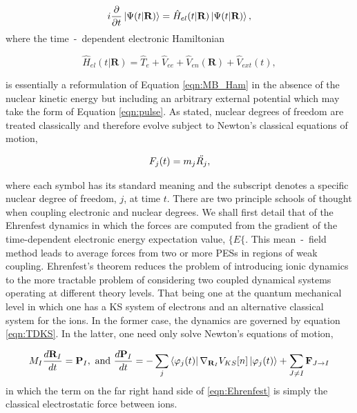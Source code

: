 \begin{equation}
    i \frac{\partial}{\partial t} \ket{\Psi(t|\textbf{R})} = \hat{H}_{el}(t|\textbf{R})\ket{\Psi(t|\textbf{R})},
    \label{eqn:nanm_TDSE}
\end{equation}
where the time~-~dependent electronic Hamiltonian 

\begin{equation}
    \hat{H}_{el}(t|\textbf{R}) = \hat{T}_{e} + \hat{V}_{ee} + \hat{V}_{en}(\textbf{R}) + \hat{V}_{ext}(t),
    \label{eqn:nanm_ham}
\end{equation}

is essentially a reformulation of Equation \ref{eqn:MB_Ham} in the absence of the nuclear kinetic energy but including an arbitrary external potential which may take the form of Equation \ref{eqn:pulse}. As stated, nuclear degrees of freedom are treated classically and therefore evolve subject to Newton's classical equations of motion,

\begin{equation}
    F_{j}(t) = m_{j}\Ddot{R_{j}},
    \label{eqng:nanm_force}
\end{equation}

where each symbol has its standard meaning and the subscript denotes a specific nuclear degree of freedom, $j$, at time $t$. There are two principle schools of thought when coupling electronic and nuclear degrees. We shall first detail that of the Ehrenfest dynamics \cite{10.1063/1.438598} in which  the forces are computed from the gradient of the time-dependent electronic energy expectation value, $\lbrace E \lbrace$. This mean~-~field method leads to average forces from two or more PESs in regions of weak coupling. Ehrenfest's theorem reduces the problem of introducing ionic dynamics to the more tractable problem of considering two coupled dynamical systems operating at different theory levels. That being one at the quantum mechanical level in which one has a KS system of electrons and an alternative classical system for the ions. In the former case, the dynamics are governed by equation \ref{eqn:TDKS}. In the latter, one need only solve Newton's equations of motion,

\begin{equation}
    M_{I}\frac{d\textbf{R}_{I}}{dt} = \textbf{P}_{I}, \text{ and } \frac{d\textbf{P}_{I}}{dt} = -\sum_{j} \bra{\varphi_{j}(t)}\nabla_{\textbf{R}_{I}}V_{KS}[n]\ket{ \varphi_{j}(t) } + \sum_{J \neq I} \textbf{F}_{J \rightarrow I}
    \label{eqn:Ehrenfest}
\end{equation}
in which the term on the far right hand side of \ref{eqn:Ehrenfest} is simply the classical electrostatic force between ions.

